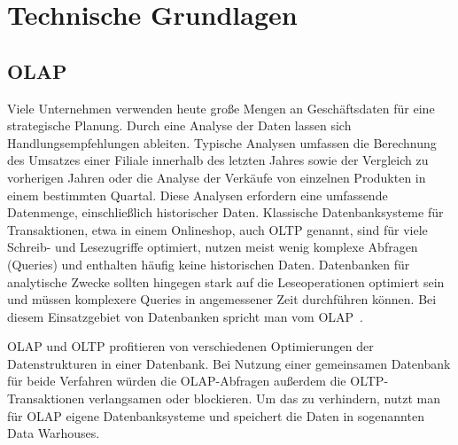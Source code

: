 \chapter{Technische Grundlagen}
\section{\acf{OLAP}}
Viele Unternehmen verwenden heute große Mengen an Geschäftsdaten für eine strategische Planung.
Durch eine Analyse der Daten lassen sich Handlungsempfehlungen ableiten.
Typische Analysen umfassen die Berechnung des Umsatzes einer Filiale innerhalb des letzten Jahres sowie der Vergleich zu vorherigen Jahren oder die Analyse der Verkäufe von einzelnen Produkten in einem bestimmten Quartal.
Diese Analysen erfordern eine umfassende Datenmenge, einschließlich historischer Daten.
Klassische Datenbanksysteme für Transaktionen, etwa in einem Onlineshop, auch \acf{OLTP} genannt, sind für viele Schreib- und Lesezugriffe optimiert, nutzen meist wenig komplexe Abfragen (Queries) und enthalten häufig keine historischen Daten.
Datenbanken für analytische Zwecke sollten hingegen stark auf die Leseoperationen optimiert sein und müssen komplexere Queries in angemessener Zeit durchführen können.
Bei diesem Einsatzgebiet von Datenbanken spricht man vom \acf{OLAP}~\cite[S.~97f]{kleppmann_datenintensive_2019}.

\ac{OLAP} und \ac{OLTP} profitieren von verschiedenen Optimierungen der Datenstrukturen in einer Datenbank.
Bei Nutzung einer gemeinsamen Datenbank für beide Verfahren würden die \ac{OLAP}-Abfragen außerdem die \ac{OLTP}-Transaktionen verlangsamen oder blockieren.
Um das zu verhindern, nutzt man für \ac{OLAP} eigene Datenbanksysteme und speichert die Daten in sogenannten Data Warhouses.

